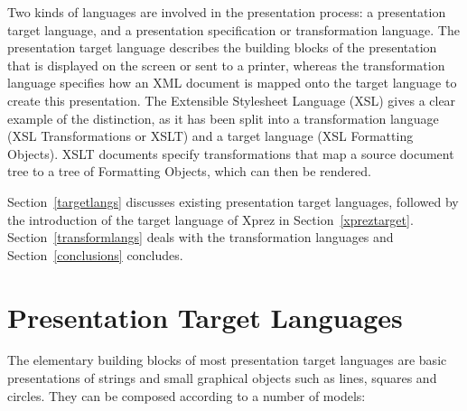 Two kinds of languages are involved in the presentation process: a presentation target language, and a presentation specification or transformation language. The presentation target language describes the building blocks of the presentation that is displayed on the screen or sent to a printer, whereas the transformation language specifies how an XML document is mapped onto the target language to create this presentation. The Extensible Stylesheet Language (XSL) gives a clear example of the distinction, as it has been split into a transformation language (XSL Transformations or XSLT) and a target language (XSL Formatting Objects). XSLT documents specify transformations that map a source document tree to a tree of Formatting Objects, which can then be rendered. 

Section~\ref{targetlangs} discusses existing presentation target languages, followed by the introduction of the target language of {\sc Xprez} in Section~\ref{xpreztarget}. Section~\ref{transformlangs} deals with the transformation languages and Section~\ref{conclusions} concludes.


%																
%																
%																
\section{Presentation Target Languages}
\label{\ch:sect:targetlangs}

The elementary building blocks of most presentation target languages are basic presentations of strings and small graphical objects such as lines, squares and circles. They can be composed according to a number of models:


